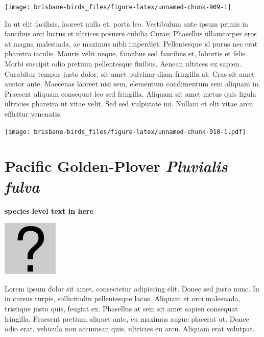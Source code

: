 \documentclass[]{book}
\let\origfigure\figure
\let\endorigfigure\endfigure
\renewenvironment{figure}[1][2] {
  \expandafter\origfigure\expandafter[H]
} {
  \endorigfigure
}
\begin{document}
\begin{figure}
\texttt{[image: brisbane-birds\_files/figure-latex/unnamed-chunk-909-1]} \caption{insert figure caption}\label{fig:unnamed-chunk-909}
\end{figure}

In ut elit facilisis, laoreet nulla et, porta leo. Vestibulum ante ipsum
primis in faucibus orci luctus et ultrices posuere cubilia Curae;
Phasellus ullamcorper eros at magna malesuada, ac maximus nibh
imperdiet. Pellentesque id purus nec erat pharetra iaculis. Mauris velit
neque, faucibus sed faucibus et, lobortis et felis. Morbi suscipit odio
pretium pellentesque finibus. Aenean ultrices ex sapien. Curabitur
tempus justo dolor, sit amet pulvinar diam fringilla at. Cras sit amet
auctor ante. Maecenas laoreet nisi sem, elementum condimentum sem
aliquam in. Praesent aliquam consequat leo sed fringilla. Aliquam sit
amet metus quis ligula ultricies pharetra ut vitae velit. Sed sed
vulputate mi. Nullam et elit vitae arcu efficitur venenatis.

\begin{figure}
\centering
\texttt{[image: brisbane-birds\_files/figure-latex/unnamed-chunk-910-1.pdf]}
\caption{\label{fig:unnamed-chunk-910}insert figure caption}
\end{figure}

\section{\texorpdfstring{Pacific Golden-Plover \emph{Pluvialis
fulva}}{Pacific Golden-Plover Pluvialis fulva}}\label{pacific-golden-plover-pluvialis-fulva}

\textbf{species level text in here}

\begin{figure}
\centering
\includegraphics{assets/missing.png}
\caption{No image for species}
\end{figure}

Lorem ipsum dolor sit amet, consectetur adipiscing elit. Donec sed justo
nunc. In in cursus turpis, sollicitudin pellentesque lacus. Aliquam et
orci malesuada, tristique justo quis, feugiat ex. Phasellus at sem sit
amet sapien consequat fringilla. Praesent pretium aliquet ante, eu
maximus augue placerat ut. Donec odio erat, vehicula non accumsan quis,
ultricies eu arcu. Aliquam erat volutpat.
\end{document}
